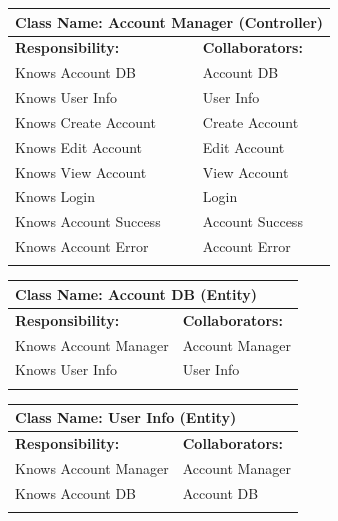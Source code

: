 \documentclass[]{article}
\begin{document}
\begin{itemize}
	\begin{table}[ht]
		\centering
		\begin{tabular}{|p{6cm}|p{6cm}|}
		\hline 
		\multicolumn{2}{|l|}{\textbf{Class Name: Account Manager (Controller)}} \\
		\hline
		\textbf{Responsibility:} & \textbf{Collaborators:} \\
		\hline
            Knows Account DB & Account DB\\
		Knows User Info & User Info\\
		Knows Create Account & Create Account\\
            Knows Edit Account & Edit Account\\
		Knows View Account & View Account\\
		Knows Login & Login\\
            Knows Account Success & Account Success\\
            Knows Account Error & Account Error\\

		\vspace{1in} & \\
		\hline
		\end{tabular}
	\end{table}

        \begin{table}[ht]
		\centering
		\begin{tabular}{|p{6cm}|p{6cm}|}
		\hline 
		\multicolumn{2}{|l|}{\textbf{Class Name: Account DB  (Entity)}} \\
		\hline
		\textbf{Responsibility:} & \textbf{Collaborators:} \\
		\hline
		Knows Account Manager & Account Manager\\
		Knows User Info & User Info\\
		\vspace{1in} & \\
		\hline
		\end{tabular}
	\end{table}

        \begin{table}[ht]
		\centering
		\begin{tabular}{|p{6cm}|p{6cm}|}
		\hline 
		\multicolumn{2}{|l|}{\textbf{Class Name: User Info (Entity)}} \\
		\hline
		\textbf{Responsibility:} & \textbf{Collaborators:} \\
		\hline
		Knows Account Manager & Account Manager\\
            Knows Account DB & Account DB\\
		\vspace{1in} & \\
		\hline
		\end{tabular}
	\end{table}


\end{itemize}
\end{document}
